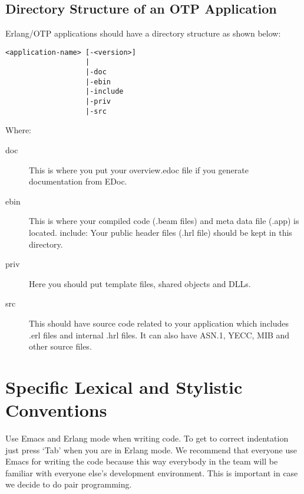 \documentclass[12pt]{article}
\begin{document}
\subsection{Directory Structure of an OTP Application}
Erlang/OTP applications should have a directory structure as shown below:
\begin{lstlisting}	
<application-name> [-<version>]
                   |
                   |-doc
                   |-ebin
                   |-include
                   |-priv
                   |-src
\end{lstlisting}
Where: 
\begin{description}
\item[doc] This is where you put your overview.edoc file if you generate documentation from EDoc. 
\item[ebin] This is where your compiled code (.beam files) and meta data file (.app) is located. 
include: Your public header files (.hrl file) should be kept in this directory.  
\item[priv] Here you should put template files, shared objects and DLLs. 
\item[src] This should have source code related to your application which includes .erl files and internal .hrl files. It can also have ASN.1, YECC, MIB and other source files.
\end{description}

\section{Specific Lexical and Stylistic Conventions}
Use Emacs and Erlang mode when writing code. To get to correct indentation just press ‘Tab’ when you are in Erlang mode. We recommend that everyone use Emacs for writing the code because this way everybody in the team will be familiar with everyone else’s development environment. This is important in case we decide to do pair programming. 
\end{document}
